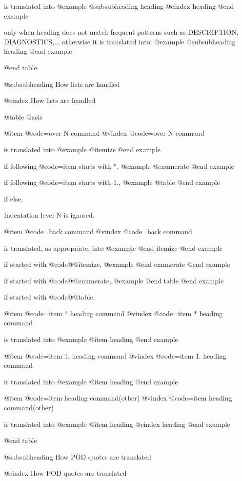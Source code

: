 is translated into
@example
        @subsubheading heading
        @cindex heading
@end example

only when heading does not match frequent patterns such as
DESCRIPTION, DIAGNOSTICS,... otherwise it is translated into:
@example
        @subsubheading heading
@end example

@end table

@subsubheading How lists are handled

@cindex How lists are handled

@table @asis

@item @code{=over N} command
@vindex @code{=over N} command

is translated into
@example
        @itemize
@end example

if following @code{=item} starts with *,
@example
        @enumerate
@end example

if following @code{=item} starts with 1.,
@example
        @table
@end example

if else.

Indentation level N is ignored.

@item @code{=back} command
@vindex @code{=back} command

is translated, as appropriate, into
@example
        @end itemize
@end example

if started with @code{@@itemize},
@example
        @end enumerate
@end example

if started with @code{@@enumerate},
@example
        @end table
@end example

if started with @code{@@table}.

@item @code{=item * heading} command
@vindex @code{=item * heading} command

is translated into
@example
        @item
        heading
@end example

@item @code{=item 1. heading} command
@vindex @code{=item 1. heading} command

is translated into
@example
        @item
        heading
@end example

@item @code{=item heading} command(other)
@vindex @code{=item heading} command(other)

is translated into
@example
        @item
        heading
        @cindex heading
@end example

@end table

@subsubheading How POD quotes are translated

@cindex How POD quotes are translated

